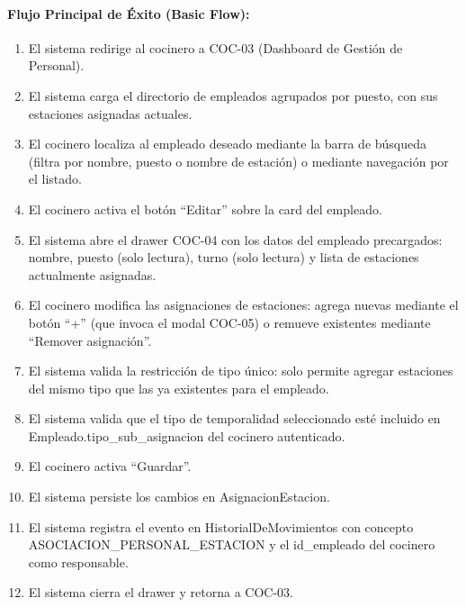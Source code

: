 \paragraph{Flujo Principal de Éxito (Basic Flow):}
\begin{enumerate}
    \item[I.] El sistema redirige al cocinero a COC-03 (Dashboard de Gestión de Personal).
    \item[II.] El sistema carga el directorio de empleados agrupados por puesto, con sus estaciones asignadas actuales.
    \item[III.] El cocinero localiza al empleado deseado mediante la barra de búsqueda (filtra por nombre, puesto o nombre de estación) o mediante navegación por el listado.
    \item[IV.] El cocinero activa el botón ``Editar'' sobre la card del empleado.
    \item[V.] El sistema abre el drawer COC-04 con los datos del empleado precargados: nombre, puesto (solo lectura), turno (solo lectura) y lista de estaciones actualmente asignadas.
    \item[VI.] El cocinero modifica las asignaciones de estaciones: agrega nuevas mediante el botón ``+'' (que invoca el modal COC-05) o remueve existentes mediante ``Remover asignación''.
    \item[VII.] El sistema valida la restricción de tipo único: solo permite agregar estaciones del mismo tipo que las ya existentes para el empleado.
    \item[VIII.] El sistema valida que el tipo de temporalidad seleccionado esté incluido en Empleado.tipo\_sub\_asignacion del cocinero autenticado.
    \item[IX.] El cocinero activa ``Guardar''.
    \item[X.] El sistema persiste los cambios en AsignacionEstacion.
    \item[XI.] El sistema registra el evento en HistorialDeMovimientos con concepto ASOCIACION\_PERSONAL\_ESTACION y el id\_empleado del cocinero como responsable.
    \item[XII.] El sistema cierra el drawer y retorna a COC-03.
\end{enumerate}

